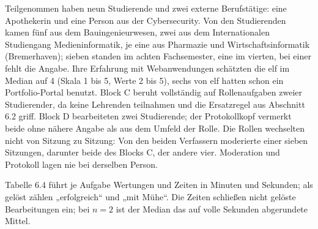 Teilgenommen haben neun Studierende und zwei externe Berufstätige: eine Apothekerin und eine Person aus der Cybersecurity. Von den Studierenden kamen fünf aus dem Bauingenieurwesen, zwei aus dem Internationalen Studiengang Medieninformatik, je eine aus Pharmazie und Wirtschaftsinformatik (Bremerhaven); sieben standen im achten Fachsemester, eine im vierten, bei einer fehlt die Angabe. Ihre Erfahrung mit Webanwendungen schätzten die elf im Median auf 4 (Skala 1 bis 5, Werte 2 bis 5), sechs von elf hatten schon ein Portfolio-Portal benutzt. Block C beruht vollständig auf Rollenaufgaben zweier Studierender, da keine Lehrenden teilnahmen und die Ersatzregel aus Abschnitt 6.2 griff. Block D bearbeiteten zwei Studierende; der Protokollkopf vermerkt beide ohne nähere Angabe als aus dem Umfeld der Rolle. Die Rollen wechselten nicht von Sitzung zu Sitzung: Von den beiden Verfassern moderierte einer sieben Sitzungen, darunter beide des Blocks C, der andere vier. Moderation und Protokoll lagen nie bei derselben Person.

Tabelle 6.4 führt je Aufgabe Wertungen und Zeiten in Minuten und Sekunden; als gelöst zählen „erfolgreich“ und „mit Mühe“. Die Zeiten schließen nicht gelöste Bearbeitungen ein; bei $n = 2$ ist der Median das auf volle Sekunden abgerundete Mittel.

